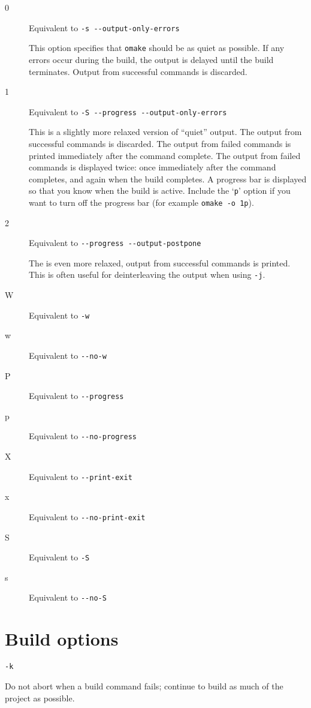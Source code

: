 \begin{description}
\item[0] Equivalent to \verb+-s --output-only-errors+

This option specifies that \verb+omake+ should be as quiet as possible.  If any errors occur
during the build, the output is delayed until the build terminates.  Output from successful commands
is discarded.

\item[1] Equivalent to \verb+-S --progress --output-only-errors+

This is a slightly more relaxed version of ``quiet'' output.  The output from successful commands is
discarded.  The output from failed commands is printed immediately after the command complete.  The
output from failed commands is displayed twice: once immediately after the command completes, and
again when the build completes.  A progress bar is displayed so that you know when the build is
active.  Include the `\verb+p+' option if you want to turn off the progress bar (for example
\verb+omake -o 1p+).

\item[2] Equivalent to \verb+--progress --output-postpone+

The is even more relaxed, output from successful commands is printed.
This is often useful for deinterleaving the output when using \verb+-j+.

\item[W] Equivalent to \verb+-w+
\item[w] Equivalent to \verb+--no-w+
\item[P] Equivalent to \verb+--progress+
\item[p] Equivalent to \verb+--no-progress+
\item[X] Equivalent to \verb+--print-exit+
\item[x] Equivalent to \verb+--no-print-exit+
\item[S] Equivalent to \verb+-S+
\item[s] Equivalent to \verb+--no-S+
\end{description}

\section{Build options}

 \verb+-k+

Do not abort when a build command fails;
continue to build as much of the project as possible.

